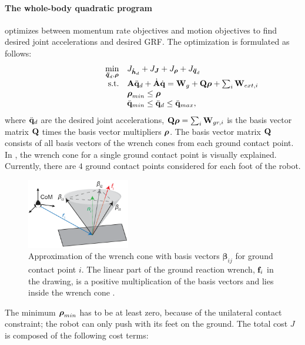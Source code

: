 \paragraph{The whole-body quadratic program} \cite{koolen2016design} optimizes between momentum rate objectives and motion objectives to find desired joint accelerations and desired \ac{GRF}. The optimization is formulated as follows:
\begin{equation}
\begin{array}{rlcl}
\displaystyle \min_{\bs{\ddot{q}}_d,\bs{\rho}} & \multicolumn{3}{l}{J_{\bs{\dot{h}}_d} + J_{\bs{J}} + J_{\bs{\rho}} + J_{\bs{\ddot{q}}_d} } \\%
\textrm{s.t.} & \matr{A}\ddqjntd + \dot{\matr{A}}\dqjnt = \matr{W}_g + \matr{Q}\bs{\rho}+\sum_i\matr{W}_{ext,i}\\
&\displaystyle \bs{\rho}_{min} \leq \bs{\rho}\\
&\ddot{\qjnt}_{min} \leq \ddqjntd \leq \ddot{\qjnt}_{max},
\end{array}
\end{equation}
where $\ddot{\mathbf{q}}_d$ are the desired joint accelerations, $\mathbf{Q}\boldsymbol{\rho} = \sum_i\mathbf{W}_{gr,i}$ is the basis vector matrix $\mathbf{Q}$ times the basis vector multipliers $\boldsymbol{\rho}$. The basis vector matrix $\mathbf{Q}$ consists of all basis vectors of the wrench cones from each ground contact point. In , the wrench cone for a single ground contact point is visually explained. Currently, there are $4$ ground contact points considered for each foot of the robot.
\begin{figure}
\centering
\includegraphics[width=0.4\textwidth]{STYLESTUFF/wrenchcone.png}
\caption{Approximation of the wrench cone with basis vectors $\boldsymbol{\beta}_{ij}$ for ground contact point $i$. The linear part of the ground reaction wrench, $\mathbf{f}_i$ in the drawing, is a positive multiplication of the basis vectors and lies inside the wrench cone \cite{koolen2016design}. }
\label{fig:wrenchcone}
\end{figure}
The minimum $\boldsymbol{\rho}_{min}$ has to be at least zero, because of the unilateral contact constraint; the robot can only push with its feet on the ground. The total cost $J$ is composed of the following cost terms:
